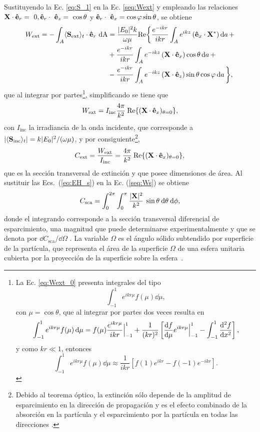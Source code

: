 %
Sustituyendo la Ec. \eqref{eq:S_1} en la Ec. \eqref{seq:Wext} y empleando las relaciones $\vb{X}\cdot \vu{e}_r=~0, \vu{e}_r\cdot~\vu{e}_z=~\cos\theta$ y $\vu{e}_r\cdot~\vu{e}_x=\cos\varphi\sin\theta$, se obtiene
%
\begin{align}
		W_{\text{ext}} = -\int_{A}\langle\vb{S}_{\text{ext}}\rangle_t\cdot\vu{e}_r\text{ dA}&=\frac{|E_0|^2k}{\omega\mu}\text{Re}\biggl\{\frac{e^{-ikr}}{ikr}\int_A e^{ikz}\left(\vu{e}_x\cdot\vb{X}^*\right)\dd{a}+ \nonumber\\
		& +\frac{e^{-ikr}}{ikr}\int_A e^{-ikz}\left(\vb{X}\cdot\vu{e}_x\right)\cos\theta\dd{a}+\nonumber\\
		&-\frac{e^{-ikr}}{ikr}\int_Ae^{-ikz}\left(\vb{X}\cdot\vu{e}_z\right)\sin\theta\cos\varphi \dd{a}\biggl\}, \label{eq:Wext_0}
\end{align}
%
que al integrar por partes\footnote{La Ec. \eqref{eq:Wext_0} presenta integrales del tipo
$$\int_{-1}^{1}e^{ikr\mu}f(\mu)\dd{\mu},$$
con $\mu=\cos\theta$, que al integrar por partes dos veces resulta en \cite{bohrenAbsorptionScatteringLight2008}
$$\int_{-1}^{1}e^{ikr\mu}f(\mu)\dd{\mu}=f(\mu)\frac{e^{ikr\mu}}{ikr}\Big|_{-1}^{1}+\frac{1}{(kr)^2}\left[\dv{f}{\mu}e^{ikr\mu}\Big|_{-1}^{1}-\int_{-1}^1\dv[2]{f}{x}\right],$$
y como $kr\ll1$, entonces \cite{bohrenAbsorptionScatteringLight2008}
$$\int_{-1}^{1}e^{ikr\mu}f(\mu)\dd{\mu}\approx \frac{1}{ikr}\left[f(1)e^{ikr}-f(-1)e^{-ikr}\right].$$
}, simplificando se tiene que \cite{bohrenAbsorptionScatteringLight2008}
%
\begin{equation*}
	W_{\text{ext}}=I_{\text{inc}}\frac{4\pi}{k^2}\:\text{Re}\{(\vb{X}\cdot\vu{e}_x)_{\theta=0}\},
\end{equation*}
%
con $I_{\text{inc}}$ la irradiancia de la onda incidente, que corresponde a $|\langle\vb{S}_{\text{inc}}\rangle_t|=k|E_0|^2/(\omega\mu)$, y por consiguiente\footnote{Debido al teorema óptico, la extinción sólo depende de la amplitud de esparcimiento en la dirección de propagación y es el efecto combinado de la absorción en la partícula y el esparcimiento por la partícula en todas las direcciones \cite{bohrenAbsorptionScatteringLight2008}.},
%
\begin{equation}
	C_{\text{ext}}=\frac{W_{\text{ext}}}{I_{\text{inc}}}=\frac{4\pi}{k^2}\:\text{Re}\{(\vb{X}\cdot\vu{e}_x)_{\theta=0}\}, \label{C_ext}
\end{equation}
%
que es la sección transversal de extinción y que posee dimensiones de área.
 Al sustituir las Ecs.~(\ref{eq:EH_s}) en la Ec. (\ref{seq:Ws}) se obtiene
%
\begin{equation}
	C_{\text{sca}}=\int_0^{2\pi}\int_0^{\pi}\frac{|\vb{X}|^2}{k^2}\:\sin\theta\: \text{d}\theta\:\text{d}\phi,
	\label{C_sca_general}
\end{equation}
donde el integrando corresponde a la sección transversal diferencial de esparcimiento, una magnitud que puede determinarse experimentalmente \cite{kinnunenEffectSizeShape2011} y que se denota por $\dd{C_{\text{sca}}}/\dd{\Omega}$ \cite{bohrenAbsorptionScatteringLight2008}. La variable $\Omega$ es el ángulo sólido subtendido por superficie de la partícula, que representa el área de la superficie $\Omega$ de una esfera unitaria cubierta por la proyección de la superficie sobre la esfera~\cite{weissteinAnguloSolido}. %

